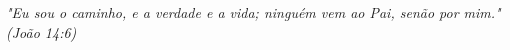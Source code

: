\begin{epigrafe}
\vspace*{\fill}
\begin{flushright}
\textit{"Eu sou o caminho, e a verdade e a vida; ninguém vem ao Pai, senão por mim." \\
(João 14:6)}
\end{flushright}
\end{epigrafe}
